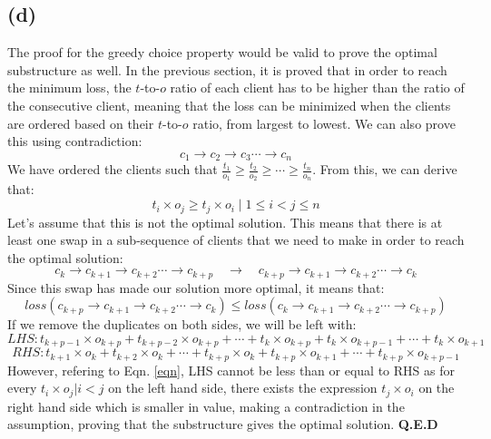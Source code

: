     \subsection{(d)}
    The proof for the greedy choice property would be valid to prove the optimal substructure as well. In the previous section, it is proved that
    in order to reach the minimum loss, the $t$-to-$o$ ratio of each client has to be higher than the ratio of the consecutive client, meaning
    that the loss can be minimized when the clients are ordered based on their $t$-to-$o$ ratio, from largest to lowest. We can also prove this
    using contradiction:
    \[ c_1 \rightarrow c_2 \rightarrow c_3 \cdots \rightarrow c_n \]
    We have ordered the clients such that $\frac{t_1}{o_1} \geq \frac{t_2}{o_2} \geq \cdots \geq \frac{t_n}{o_n}$. From this, we can derive that:
    \begin{equation} \label{eqn}
    t_i \times o_j \geq t_j \times o_i \; | \; 1 \leq i < j \leq n
    \end{equation}
    Let's assume that this is not the optimal solution. This means that there is at least one swap in a sub-sequence of clients that we need to make
    in order to reach the optimal solution:
    \[ c_k \rightarrow c_{k+1} \rightarrow c_{k+2} \cdots \rightarrow c_{k+p} \quad \rightarrow \quad
    c_{k+p} \rightarrow c_{k+1} \rightarrow c_{k+2} \cdots \rightarrow c_{k} \]
    Since this swap has made our solution more optimal, it means that:
    \[ loss(c_{k+p} \rightarrow c_{k+1} \rightarrow c_{k+2} \cdots \rightarrow c_{k}) \leq loss(c_{k} \rightarrow c_{k+1} \rightarrow c_{k+2} \cdots \rightarrow c_{k+p}) \]
    If we remove the duplicates on both sides, we will be left with:
    \[ LHS: t_{k+p-1} \times o_{k+p} + t_{k+p-2} \times o_{k+p} + \cdots + t_{k} \times o_{k+p} + t_{k} \times o_{k+p-1} + \cdots + t_{k} \times o_{k+1} \]
    \[ RHS: t_{k+1} \times o_{k} + t_{k+2} \times o_{k} + \cdots + t_{k+p} \times o_{k} + t_{k+p} \times o_{k+1} + \cdots + t_{k+p} \times o_{k+p-1} \]
    However, refering to Eqn. \ref{eqn}, LHS cannot be less than or equal to RHS as for every $t_i \times o_j | i<j$ on the left hand side, there exists the expression
    $t_j \times o_i$ on the right hand side which is smaller in value, making a contradiction in the assumption, proving that the substructure gives the
    optimal solution. \textbf{Q.E.D}